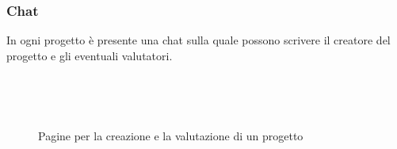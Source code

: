 \documentclass{article}
\begin{document}
\subsubsection{Chat}
In ogni progetto è presente una chat sulla quale possono scrivere il creatore del progetto e gli eventuali valutatori.
\begin{figure}[!h]
    \begin{minipage}[c]{0.5\linewidth}
        \centering
        \\
    \end{minipage}\hfill
    \begin{minipage}[c]{0.5\linewidth}
        \centering
        \\
    \end{minipage}
    \caption{Pagine per la creazione e la valutazione di un progetto}
\end{figure}
\end{document}
